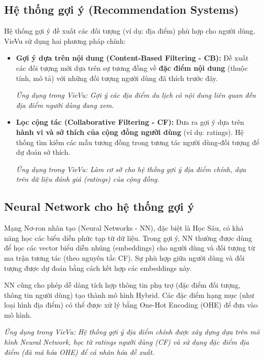 \subsection{Hệ thống gợi ý (Recommendation Systems)}

Hệ thống gợi ý đề xuất các đối tượng (ví dụ: địa điểm) phù hợp cho người dùng. VieVu sử dụng hai phương pháp chính:
\begin{itemize}
    \item \textbf{Gợi ý dựa trên nội dung (Content-Based Filtering - CB)\cite{cb_concept}:} Đề xuất các đối tượng mới dựa trên sự tương đồng về \textbf{đặc điểm nội dung} (thuộc tính, mô tả) với những đối tượng người dùng đã thích trước đây.

    \textit{Ứng dụng trong VieVu: Gợi ý các địa điểm du lịch có nội dung liên quan đến địa điểm người dùng đang xem.}

    \item \textbf{Lọc cộng tác (Collaborative Filtering - CF)\cite{cf_concept}:} Đưa ra gợi ý dựa trên \textbf{hành vi và sở thích của cộng đồng người dùng} (ví dụ: ratings). Hệ thống tìm kiếm các mẫu tương đồng trong tương tác người dùng-đối tượng để dự đoán sở thích.

    \textit{Ứng dụng trong VieVu: Làm cơ sở cho hệ thống gợi ý địa điểm chính, dựa trên dữ liệu đánh giá (ratings) của cộng đồng.}
\end{itemize}
\subsection{Neural Network cho hệ thống gợi ý}

Mạng Nơ-ron nhân tạo (Neural Networks - NN), đặc biệt là Học Sâu, có khả năng học các biểu diễn phức tạp từ dữ liệu. Trong gợi ý, NN thường được dùng để học các vector biểu diễn nhúng (embeddings) cho người dùng và đối tượng từ ma trận tương tác (theo nguyên tắc CF). Sự phù hợp giữa người dùng và đối tượng được dự đoán bằng cách kết hợp các embeddings này.

NN cũng cho phép dễ dàng tích hợp thông tin phụ trợ (đặc điểm đối tượng, thông tin người dùng) tạo thành mô hình Hybrid. Các đặc điểm hạng mục (như loại hình địa điểm) có thể được xử lý bằng One-Hot Encoding (OHE) \cite{ohe_concept} để đưa vào mô hình.

\textit{Ứng dụng trong VieVu: Hệ thống gợi ý địa điểm chính được xây dựng dựa trên mô hình Neural Network, học từ ratings người dùng (CF) và sử dụng đặc điểm địa điểm (đã mã hóa OHE) để cá nhân hóa đề xuất.}

